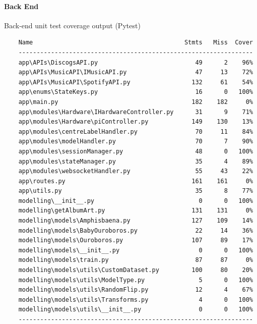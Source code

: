 \begin{uomappendix}
                \paragraph{Back End}
                \begin{table}
                    \centering
                    \caption{Back-end unit test coverage output (Pytest)}
                    \begin{verbatim}
    Name                                          Stmts   Miss  Cover
    -----------------------------------------------------------------
    app\APIs\DiscogsAPI.py                           49      2    96%
    app\APIs\MusicAPI\IMusicAPI.py                   47     13    72%
    app\APIs\MusicAPI\SpotifyAPI.py                 132     61    54%
    app\enums\StateKeys.py                           16      0   100%
    app\main.py                                     182    182     0%
    app\modules\Hardware\IHardwareController.py      31      9    71%
    app\modules\Hardware\piController.py            149    130    13% 
    app\modules\centreLabelHandler.py                70     11    84% 
    app\modules\modelHandler.py                      70      7    90%
    app\modules\sessionManager.py                    48      0   100%
    app\modules\stateManager.py                      35      4    89%
    app\modules\websocketHandler.py                  55     43    22%
    app\routes.py                                   161    161     0%
    app\utils.py                                     35      8    77%
    modelling\__init__.py                             0      0   100%
    modelling\getAlbumArt.py                        131    131     0%
    modelling\models\Amphisbaena.py                 127    109    14%
    modelling\models\BabyOuroboros.py                22     14    36%
    modelling\models\Ouroboros.py                   107     89    17%
    modelling\models\__init__.py                      0      0   100%
    modelling\models\train.py                        87     87     0%
    modelling\models\utils\CustomDataset.py         100     80    20%
    modelling\models\utils\ModelType.py               5      0   100%
    modelling\models\utils\RandomFlip.py             12      4    67%
    modelling\models\utils\Transforms.py              4      0   100%
    modelling\models\utils\__init__.py                0      0   100%
    -----------------------------------------------------------------
                    \end{verbatim}
                \end{table}
    

\end{uomappendix}
